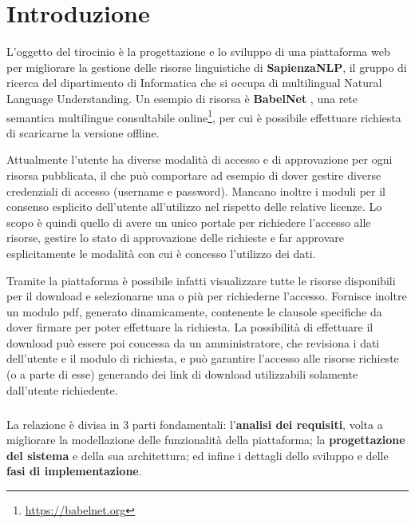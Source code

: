 
\chapter{Introduzione}

L'oggetto del tirocinio è la progettazione e lo sviluppo di una piattaforma web
per migliorare la gestione delle risorse linguistiche di \textbf{SapienzaNLP},
il gruppo di ricerca del dipartimento di Informatica che si occupa di multilingual
Natural Language Understanding.
Un esempio di risorsa è \textbf{BabelNet} \cite{NavigliPonzetto:12aij}, una rete
semantica multilingue consultabile online\footnote{\url{https://babelnet.org}},
per cui è possibile effettuare richiesta di scaricarne la versione offline.

Attualmente l'utente ha diverse modalità di accesso e di approvazione per ogni
risorsa pubblicata, il che può comportare ad esempio di dover gestire diverse
credenziali di accesso (username e password). Mancano inoltre i moduli per il
consenso esplicito dell'utente all'utilizzo nel rispetto delle relative licenze.
Lo scopo è quindi quello di avere un unico portale per richiedere l'accesso alle
risorse, gestire lo stato di approvazione delle richieste e far approvare
esplicitamente le modalità con cui è concesso l'utilizzo dei dati.

Tramite la piattaforma è possibile infatti visualizzare tutte le risorse
disponibili per il download e selezionarne una o più per richiederne l'accesso.
Fornisce inoltre un modulo pdf, generato dinamicamente, contenente le clausole
specifiche da dover firmare per poter effettuare la richiesta. La possibilità di
effettuare il download può essere poi concessa da un amministratore, che revisiona
i dati dell'utente e il modulo di richiesta, e può garantire l'accesso alle risorse
richieste (o a parte di esse) generando dei link di download utilizzabili
solamente dall'utente richiedente.

\paragraph{}
La relazione è divisa in 3 parti fondamentali: l'\textbf{analisi dei requisiti},
volta a migliorare la modellazione delle funzionalità della piattaforma; la
\textbf{progettazione del sistema} e della sua architettura; ed infine i dettagli
dello sviluppo e delle \textbf{fasi di implementazione}.